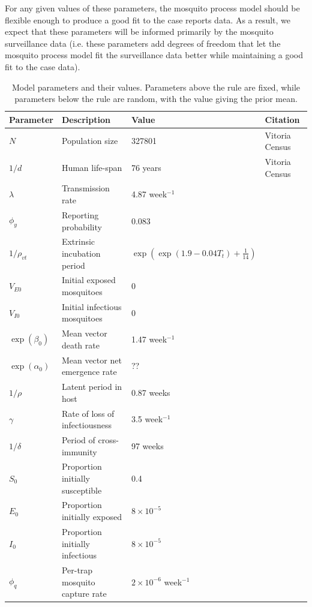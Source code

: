 \documentclass[10pt,letterpaper]{article}
\begin{document}
For any given values of these parameters, the mosquito process model should be flexible enough to produce a good fit to the case reports data.
As a result, we expect that these parameters will be informed primarily by the mosquito surveillance data (i.e. these parameters add degrees of freedom that let the mosquito process model fit the surveillance data better while maintaining a good fit to the case data).

\begin{table}[!ht]
\label{fixedparms}
\begin{adjustwidth}{-2.25in}{0in} 
\begin{center}
\caption{Model parameters and their values.  Parameters above the rule are fixed, while parameters below the rule are random, with the value giving the prior mean.}
\begin{tabular}{llll}
Parameter & Description & Value & Citation\\
\hline
$N$ & Population size & 327801 & Vitoria Census\\
$1/d$ & Human life-span & 76 years & Vitoria Census\\
$\lambda$ & Transmission rate & 4.87 week$^{-1}$ & \cite{Scott2000}\\
$\phi_y$ & Reporting probability & 0.083 & \cite{Silva2016}\\
$1/\rho_{vt}$ & Extrinsic incubation period & $\exp \left(\exp(1.9 - 0.04 T_t) + \frac{1}{14}\right)$ & \cite{Chan2012}\\
$V_{E0}$ & Initial exposed mosquitoes &  0 & \\
$V_{I0}$ & Initial infectious mosquitoes & 0 & \\
\hline
$\exp(\beta_0)$ & Mean vector death rate & 1.47 week$^{-1}$ & \cite{Brady2013} \\
$\exp(\alpha_0)$ & Mean vector net emergence rate & ?? & \\
$1/\rho$ & Latent period in host & 0.87 weeks  & \cite{Chan2012}\\
$\gamma$ & Rate of loss of infectiousness & 3.5 week$^{-1}$ & \cite{Nguyet2013}\\
$1/\delta$ & Period of cross-immunity & 97 weeks &  \cite{Reich2013}\\
$S_0$ & Proportion initially susceptible & 0.4 & \cite{Cardoso2011a} \\
$E_0$ & Proportion initially exposed & $8\times 10 ^ {-5}$ & \\
$I_0$ & Proportion initially infectious & $8\times 10 ^ {-5}$ & \\
$\phi_q$ & Per-trap mosquito capture rate & $2 \times 10^{-6}$ week$^{-1}$ & 
\end{tabular}
\end{center}
\end{adjustwidth}
\end{table}
\end{document}
